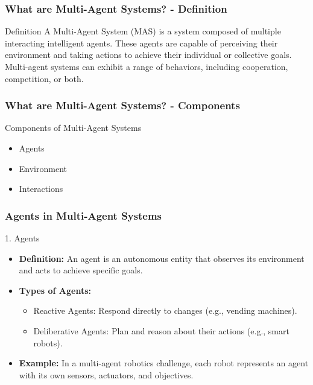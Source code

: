 \documentclass[aspectratio=169]{beamer}
\begin{document}
\begin{frame}[fragile]
    \frametitle{What are Multi-Agent Systems? - Definition}
    \begin{block}{Definition}
        A Multi-Agent System (MAS) is a system composed of multiple interacting intelligent agents. 
        These agents are capable of perceiving their environment and taking actions to achieve their individual or collective goals. 
        Multi-agent systems can exhibit a range of behaviors, including cooperation, competition, or both.
    \end{block}
\end{frame}

\begin{frame}[fragile]
    \frametitle{What are Multi-Agent Systems? - Components}
    \begin{block}{Components of Multi-Agent Systems}
        \begin{itemize}
            \item Agents
            \item Environment
            \item Interactions
        \end{itemize}
    \end{block}
\end{frame}

\begin{frame}[fragile]
    \frametitle{Agents in Multi-Agent Systems}
    \begin{block}{1. Agents}
        \begin{itemize}
            \item \textbf{Definition:} An agent is an autonomous entity that observes its environment and acts to achieve specific goals.
            \item \textbf{Types of Agents:}
                \begin{itemize}
                    \item Reactive Agents: Respond directly to changes (e.g., vending machines).
                    \item Deliberative Agents: Plan and reason about their actions (e.g., smart robots).
                \end{itemize}
            \item \textbf{Example:} In a multi-agent robotics challenge, each robot represents an agent with its own sensors, actuators, and objectives.
        \end{itemize}
    \end{block}
\end{frame}
\end{document}
